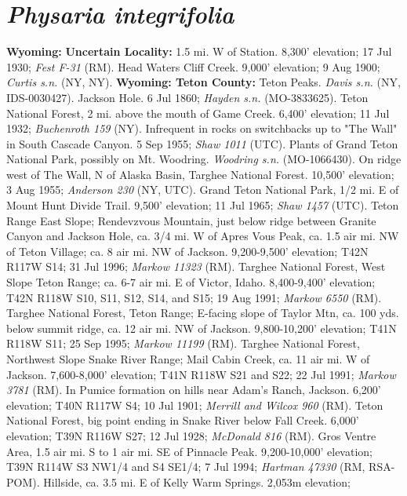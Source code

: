 \section*{\textit{Physaria integrifolia}}

  \textbf{Wyoming:}
  \textbf{Uncertain Locality:}
1.5 mi. W of Station. 8,300' elevation; 17 Jul 1930; \textit{Fest F-31} (RM).
Head Waters Cliff Creek. 9,000' elevation; 9 Aug 1900;
\textit{Curtis s.n.} (NY, NY).
  \textbf{Wyoming: Teton County:}
Teton Peaks. \textit{Davis s.n.} (NY, IDS-0030427).
Jackson Hole. 6 Jul 1860; \textit{Hayden s.n.} (MO-3833625).
Teton National Forest, 2 mi. above the mouth of Game Creek. 6,400' elevation;
11 Jul 1932; \textit{Buchenroth 159} (NY).
Infrequent in rocks on switchbacks up to "The Wall" in South Cascade Canyon.
5 Sep 1955; \textit{Shaw 1011} (UTC).
Plants of Grand Teton National Park, possibly on Mt. Woodring.
\textit{Woodring s.n.} (MO-1066430).
On ridge west of The Wall, N of Alaska Basin, Targhee National Forest.
10,500' elevation; 3 Aug 1955; \textit{Anderson 230} (NY, UTC).
Grand Teton National Park, 1/2 mi. E of Mount Hunt Divide Trail.
9,500' elevation; 11 Jul 1965; \textit{Shaw 1457} (UTC).
Teton Range East Slope; Rendevzvous Mountain, just below ridge between
Granite Canyon and Jackson Hole, ca. 3/4 mi. W of Apres Vous Peak, ca. 1.5 air
mi. NW of Teton Village; ca. 8 air mi. NW of Jackson. 9,200-9,500' elevation;
T42N R117W S14; 31 Jul 1996; \textit{Markow 11323} (RM).
Targhee National Forest, West Slope Teton Range; ca. 6-7 air mi. E of Victor,
Idaho. 8,400-9,400' elevation; T42N R118W S10, S11, S12, S14, and S15;
19 Aug 1991; \textit{Markow 6550} (RM).
Targhee National Forest, Teton Range; E-facing slope of Taylor Mtn, ca. 100 yds.
below summit ridge, ca. 12 air mi. NW of Jackson. 9,800-10,200' elevation;
T41N R118W S11; 25 Sep 1995; \textit{Markow 11199} (RM).
Targhee National Forest, Northwest Slope Snake River Range; Mail Cabin Creek,
ca. 11 air mi. W of Jackson. 7,600-8,000’ elevation; T41N R118W S21 and S22;
22 Jul 1991; \textit{Markow 3781} (RM).
In Pumice formation on hills near Adam's Ranch, Jackson. 6,200' elevation;
T40N R117W S4; 10 Jul 1901; \textit{Merrill and Wilcox 960} (RM).
Teton National Forest, big point ending in Snake River below Fall Creek.
6,000' elevation; T39N R116W S27; 12 Jul 1928; \textit{McDonald 816} (RM).
Gros Ventre Area, 1.5 air mi. S to 1 air mi. SE of Pinnacle Peak.
9,200-10,000' elevation; T39N R114W S3 NW1/4 and S4 SE1/4; 7 Jul 1994;
\textit{Hartman 47330} (RM, RSA-POM).
Hillside, ca. 3.5 mi. E of Kelly Warm Springs. 2,053m elevation;
